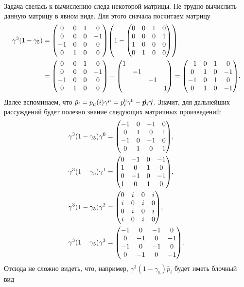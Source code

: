 \documentclass[12pt]{article}
\begin{document}
	Задача свелась к вычислению следа некоторой матрицы. Не трудно вычислить данную матрицу в явном виде. Для этого сначала посчитаем матрицу
	\begin{equation*}
		\begin{split}
			\gamma^3(1-\gamma_5) &= \mqty(0&0&1&0 \\ 0&0&0&-1 \\ -1&0&0&0 \\ 0&1&0&0 ) \qty(1 - \mqty(0&0&1&0 \\ 0&0&0&1 \\ 1&0&0&0 \\ 0&1&0&0 ))\\
			&= \mqty(0&0&1&0 \\ 0&0&0&-1 \\ -1&0&0&0 \\ 0&1&0&0 ) - \mqty(\dmat{1,-1,-1,1}) = \mqty(-1&0&1&0 \\ 0&1&0&-1 \\ -1&0&1&0 \\ 0&1&0&-1).
		\end{split}
	\end{equation*}
	Далее вспоминаем, что $\hat{p}_i = p_\mu(i)\gamma^\mu = p^0_i\gamma^0 - \va*{p}_i \va*{\gamma}$. Значит, для дальнейших рассуждений будет полезно знание следующих матричных произведений:
	\begin{equation*}
		\begin{split}
			&\gamma^3(1-\gamma_5) \gamma^0 = \mqty(-1&0&-1&0 \\ 0&1&0&1 \\ -1&0&-1&0 \\ 0&1&0&1),
			\\
			&\gamma^3(1-\gamma_5) \gamma^1 = \mqty(0&-1&0&-1 \\ 1&0&1&0 \\ 0&-1&0&-1 \\ 1&0&1&0),\\
			&\gamma^3(1-\gamma_5) \gamma^2 = \mqty(0&i&0&i \\ i&0&i&0 \\ 0&i&0&i \\ i&0&i&0),\\
			&\gamma^3(1-\gamma_5) \gamma^3 =  \mqty(-1&0&-1&0 \\ 0&-1&0&-1 \\ -1&0&-1&0 \\ 0&-1&0&-1).
		\end{split}
	\end{equation*}
	Отсюда не сложно видеть, что, например, $\gamma^3(1-\gamma_5)\hat{p}_i$ будет иметь блочный вид
\end{document}
